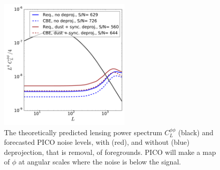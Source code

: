 \documentclass[PICOReport.tex]{subfiles}
\begin{document}

\begin{figure}
\hspace{-0.2in}
\parbox{3.0in}{\centerline {
\includegraphics[width=2.5in]{images/lensingNoisePICO_log.pdf} } }
\hspace{0.in}
\parbox{3.3in}{
\caption{ \label{fig:lensingNoisePICO} The theoretically predicted lensing power spectrum $C_{L}^{\phi \phi}$ (black) and forecasted PICO noise levels, with (red), and without (blue) deprojection, that is removal, of foregrounds. PICO will make a map of $\phi$ at angular scales where the noise is below the signal.  
} }
\vspace{-0.1in}
\end{figure}
\end{document}
